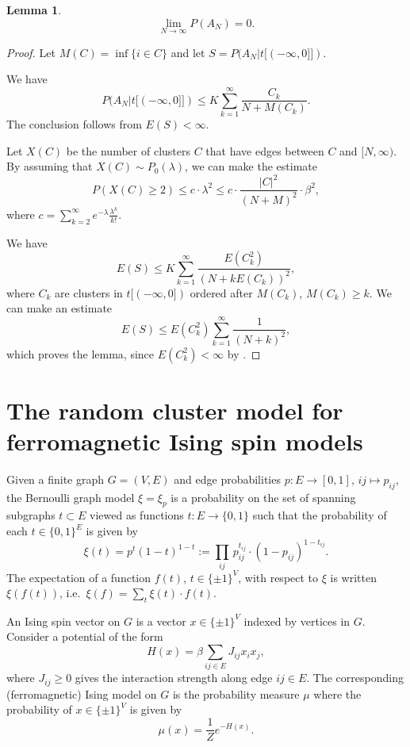 \documentclass[11pt, a4paper, oneside]{article}
\newtheorem{lem}[thm]{Lemma}
\theoremstyle{definition}
\theoremstyle{remark}
\begin{document}
\begin{lem}
$$\lim_{N\to \infty} P(A_N)=0.$$
\end{lem}

\begin{proof}
  Let $M(C)=\inf \{i\in C \}$ and let $S=P(A_N |t[(-\infty, 0]])$.

  We have
$$P(A_N|t[(-\infty, 0]])\leq K \sum_{k=1}^\infty \frac{C_k}{N+M(C_k)}.$$
The conclusion follows from $E(S)<\infty$.

Let $X(C)$ be the number of clusters $C$ that have edges between $C$ and
$[N,\infty)$. By assuming that $X(C)\sim P_0(\lambda)$, we can make the estimate
$$P(X(C)\geq 2)\leq c\cdot \lambda^2 \leq c\cdot \frac{|C|^2}{(N+M)^2}\cdot \beta^2,$$
where $c=\sum_{k=2}^\infty e^{-\lambda} \frac{\lambda^k}{k!}$.

We have
$$E(S) \leq K \sum_{k=1}^\infty \frac{E(C_k^2)}{(N+k E(C_k))^2},$$
where $C_k$ are clusters in $t[(-\infty, 0])$ ordered after $M(C_k)$,
$M(C_k)\geq k$. We can make an estimate
$$E(S)\leq E(C_k^2)\sum _{k=1}^\infty \frac{1}{(N+k)^2},$$
which proves the lemma, since $E(C_k^2)<\infty$ by \cite{kesten}.

\end{proof}

\section{The random cluster model for ferromagnetic Ising spin models}

\def\SI{\{\pm1\}}
\def\SB{\{0,1\}}
\def\b{b}

Given a finite graph $G=(V,E)$ and edge probabilities $p:E\to[0,1]$, $ij\mapsto p_{ij}$, the
Bernoulli graph model $\xi = \xi_p$ is a probability on the set of spanning subgraphs
$t\subset E$ viewed as functions $t:E\to\{0,1\}$ such that the probability of each
$t\in\{0,1\}^E$ is given by
\[ \xi(t) = p^t(1-t)^{1-t} := \prod_{ij}\, p_{ij}^{t_{ij}}\cdot
  (1-p_{ij})^{1-t_{ij}}. \] The expectation of a function $f(t)$, $t\in\SI^V$,
with respect to $\xi$ is written $\xi(f(t))$, i.e.\
\(\xi(f) = \sum_{t} \xi(t)\cdot f(t)\).

An Ising spin vector on $G$ is a vector $x\in\SI^V$ indexed by vertices in $G$.
Consider a potential of the form
\[ H(x) = \beta \sum_{ij\in E} J_{ij} x_i x_j, \] where $J_{ij}\geq 0$ gives the
interaction strength along edge $ij\in E$. The corresponding (ferromagnetic)
Ising model on $G$ is the probability measure $\mu$ where the probability of
$x\in \SI^V$ is given by
\[ \mu(x) = \frac 1{Z} e^{-H(x)}. \]
\end{document}
